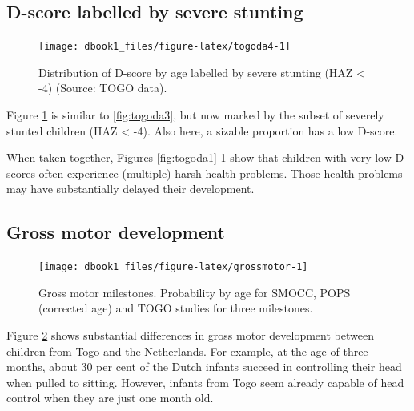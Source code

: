 \documentclass[
]{book}
\begin{document}
\hypertarget{d-score-labelled-by-severe-stunting}{%
\subsection{D-score labelled by severe stunting}\label{d-score-labelled-by-severe-stunting}}

\begin{figure}

{\centering \texttt{[image: dbook1\_files/figure-latex/togoda4-1]} 

}

\caption{Distribution of D-score by age labelled by severe stunting (HAZ \textless{} -4) (Source: TOGO data).}\label{fig:togoda4}
\end{figure}



Figure \ref{fig:togoda4} is similar to \ref{fig:togoda3}, but now marked by the subset of severely stunted children (HAZ \textless{} -4). Also here, a sizable proportion has a low D-score.

When taken together, Figures \ref{fig:togoda1}-\ref{fig:togoda4} show that children with very low D-scores often experience (multiple) harsh health problems. Those health problems may have substantially delayed their development.

\hypertarget{gross-motor-development}{%
\subsection{Gross motor development}\label{gross-motor-development}}

\begin{figure}

{\centering \texttt{[image: dbook1\_files/figure-latex/grossmotor-1]} 

}

\caption{Gross motor milestones. Probability by age for SMOCC, POPS (corrected age) and TOGO studies for three milestones.}\label{fig:grossmotor}
\end{figure}



Figure \ref{fig:grossmotor} shows substantial differences in gross motor development between children from Togo and the Netherlands. For example, at the age of three months, about 30 per cent of the Dutch infants succeed in controlling their head when pulled to sitting. However, infants from Togo seem already capable of head control when they are just one month old.
\end{document}
